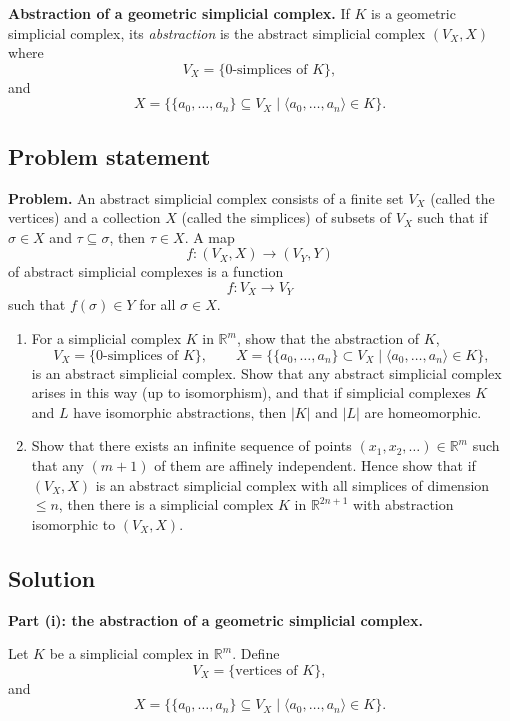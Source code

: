\documentclass[12pt,a4paper]{article}
\theoremstyle{notespace}
\begin{document}
\textbf{Abstraction of a geometric simplicial complex.}
If \(K\) is a geometric simplicial complex, its \emph{abstraction} is the abstract simplicial complex \((V_X,X)\) where
\[
V_X=\{0\text{-simplices of }K\},
\]
and
\[
X=\bigl\{\{a_0,\dots,a_n\}\subseteq V_X \mid \langle a_0,\dots,a_n\rangle\in K\bigr\}.
\]

\subsection{Problem statement}

\textbf{Problem.}
An abstract simplicial complex consists of a finite set \(V_X\) (called the vertices) and a collection \(X\) (called the simplices) of subsets of \(V_X\) such that if \(\sigma\in X\) and \(\tau\subseteq \sigma\), then \(\tau\in X\). A map
\[
f:(V_X,X)\to (V_Y,Y)
\]
of abstract simplicial complexes is a function
\[
f:V_X\to V_Y
\]
such that \(f(\sigma)\in Y\) for all \(\sigma\in X\).

\begin{enumerate}
	\item[(i)] For a simplicial complex \(K\) in \(\mathbb R^m\), show that the abstraction of \(K\),
	\[
	V_X=\{0\text{-simplices of }K\},
	\qquad
	X=\bigl\{\{a_0,\dots,a_n\}\subset V_X \mid \langle a_0,\dots,a_n\rangle\in K\bigr\},
	\]
	is an abstract simplicial complex. Show that any abstract simplicial complex arises in this way (up to isomorphism), and that if simplicial complexes \(K\) and \(L\) have isomorphic abstractions, then \(|K|\) and \(|L|\) are homeomorphic.
	
	\item[(ii)] Show that there exists an infinite sequence of points \((x_1,x_2,\dots)\in \mathbb R^m\) such that any \((m+1)\) of them are affinely independent. Hence show that if \((V_X,X)\) is an abstract simplicial complex with all simplices of dimension \(\le n\), then there is a simplicial complex \(K\) in \(\mathbb R^{2n+1}\) with abstraction isomorphic to \((V_X,X)\).
\end{enumerate}

\subsection{Solution}

\textbf{Part (i): the abstraction of a geometric simplicial complex.}

Let \(K\) be a simplicial complex in \(\mathbb R^m\). Define
\[
V_X=\{\text{vertices of }K\},
\]
and
\[
X=\bigl\{\{a_0,\dots,a_n\}\subseteq V_X \mid \langle a_0,\dots,a_n\rangle\in K\bigr\}.
\]
\end{document}
